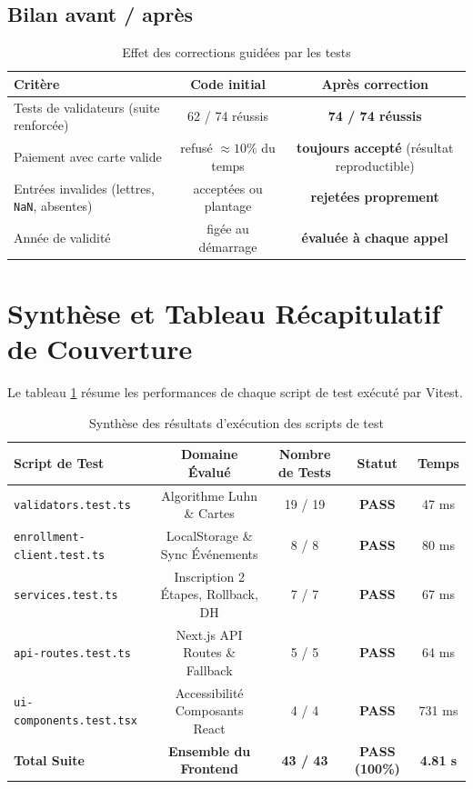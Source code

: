 \documentclass[12pt,a4paper]{article}
\begin{document}
\subsection{Bilan avant / après}
\begin{table}[h!]
\centering
\small
\begin{tabular}{lcc}
\toprule
\textbf{Critère} & \textbf{Code initial} & \textbf{Après correction} \\
\midrule
Tests de validateurs (suite renforcée) & 62 / 74 réussis & \textbf{74 / 74 réussis} \\
Paiement avec carte valide & refusé $\approx 10\%$ du temps & \textbf{toujours accepté} (résultat reproductible) \\
Entrées invalides (lettres, \texttt{NaN}, absentes) & acceptées ou plantage & \textbf{rejetées proprement} \\
Année de validité & figée au démarrage & \textbf{évaluée à chaque appel} \\
\bottomrule
\end{tabular}
\caption{Effet des corrections guidées par les tests}
\end{table}

\section{Synthèse et Tableau Récapitulatif de Couverture}
Le tableau \ref{tab:final-summary} résume les performances de chaque script de test exécuté par Vitest.

\begin{table}[h!]
\centering
\small
\begin{tabular}{lcccc}
\toprule
\textbf{Script de Test} & \textbf{Domaine Évalué} & \textbf{Nombre de Tests} & \textbf{Statut} & \textbf{Temps} \\
\midrule
\texttt{validators.test.ts} & Algorithme Luhn \& Cartes & 19 / 19 & \textbf{PASS} & 47 ms \\
\texttt{enrollment-client.test.ts} & LocalStorage \& Sync Événements & 8 / 8 & \textbf{PASS} & 80 ms \\
\texttt{services.test.ts} & Inscription 2 Étapes, Rollback, DH & 7 / 7 & \textbf{PASS} & 67 ms \\
\texttt{api-routes.test.ts} & Next.js API Routes \& Fallback & 5 / 5 & \textbf{PASS} & 64 ms \\
\texttt{ui-components.test.tsx} & Accessibilité Composants React & 4 / 4 & \textbf{PASS} & 731 ms \\
\midrule
\textbf{Total Suite} & \textbf{Ensemble du Frontend} & \textbf{43 / 43} & \textbf{PASS (100\%)} & \textbf{4.81 s} \\
\bottomrule
\end{tabular}
\caption{Synthèse des résultats d'exécution des scripts de test}
\label{tab:final-summary}
\end{table}
\end{document}
